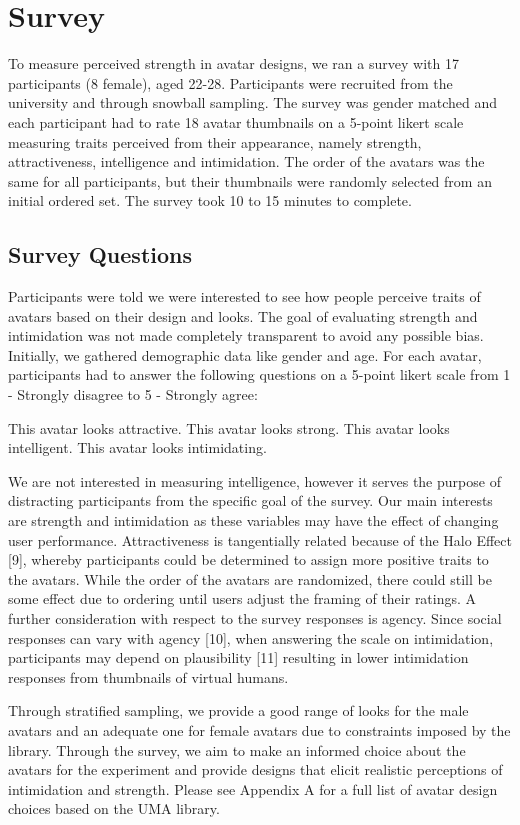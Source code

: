 
\section{Survey}
To measure perceived strength in avatar designs, we ran a survey with 17 participants (8 female), aged 22-28. Participants were recruited from the university and through snowball sampling. The survey was gender matched and each participant had to rate 18 avatar thumbnails on a 5-point likert scale measuring traits perceived from their appearance, namely strength, attractiveness, intelligence and intimidation. The order of the avatars was the same for all participants, but their thumbnails were randomly selected from an initial ordered set. The survey took 10 to 15 minutes to complete. 

\subsection{Survey Questions}
Participants were told we were interested to see how people perceive traits of avatars based on their design and looks. The goal of evaluating strength and intimidation was not made completely transparent to avoid any possible bias. Initially, we gathered demographic data like gender and age. For each avatar, participants had to answer the following questions on a 5-point likert scale from 1 - Strongly disagree to 5 - Strongly agree:

This avatar looks attractive.
This avatar looks strong.
This avatar looks intelligent. 
This avatar looks intimidating.

We are not interested in measuring intelligence, however it serves the purpose of distracting participants from the specific goal of the survey. Our main interests are strength and intimidation as these variables may have the effect of changing user performance. Attractiveness is tangentially related because of the Halo Effect [9], whereby participants could be determined to assign more positive traits to the avatars. While the order of the avatars are randomized, there could still be some effect due to ordering until users adjust the framing of their ratings. A further consideration with respect to the survey responses is agency. Since social responses can vary with agency [10],  when answering the scale on intimidation, participants may depend on plausibility [11] resulting in lower intimidation responses from thumbnails of virtual humans.

 
Through stratified sampling, we provide a good range of looks for the male avatars and an adequate one for female avatars due to constraints imposed by the library. Through the survey, we aim to make an informed choice about the avatars for the experiment and provide designs that elicit realistic perceptions of intimidation and strength. Please see Appendix A for a full list of avatar design choices based on the UMA library.

